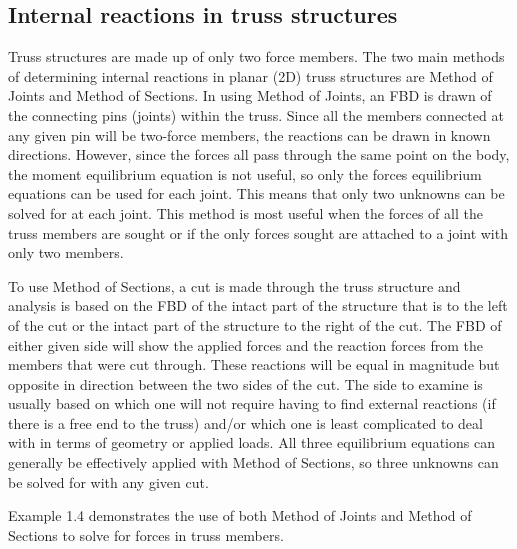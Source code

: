 \documentclass[
  letterpaper,
  DIV=11,
  numbers=noendperiod]{scrreprt}
\begin{document}
\subsection{Internal reactions in truss
structures}\label{internal-reactions-in-truss-structures}

Truss structures are made up of only two force members. The two main
methods of determining internal reactions in planar (2D) truss
structures are Method of Joints and Method of Sections. In using Method
of Joints, an FBD is drawn of the connecting pins (joints) within the
truss. Since all the members connected at any given pin will be
two-force members, the reactions can be drawn in known directions.
However, since the forces all pass through the same point on the body,
the moment equilibrium equation is not useful, so only the forces
equilibrium equations can be used for each joint. This means that only
two unknowns can be solved for at each joint. This method is most useful
when the forces of all the truss members are sought or if the only
forces sought are attached to a joint with only two members.

To use Method of Sections, a cut is made through the truss structure and
analysis is based on the FBD of the intact part of the structure that is
to the left of the cut or the intact part of the structure to the right
of the cut. The FBD of either given side will show the applied forces
and the reaction forces from the members that were cut through. These
reactions will be equal in magnitude but opposite in direction between
the two sides of the cut. The side to examine is usually based on which
one will not require having to find external reactions (if there is a
free end to the truss) and/or which one is least complicated to deal
with in terms of geometry or applied loads. All three equilibrium
equations can generally be effectively applied with Method of Sections,
so three unknowns can be solved for with any given cut.

Example 1.4 demonstrates the use of both Method of Joints and Method of
Sections to solve for forces in truss members.
\end{document}
